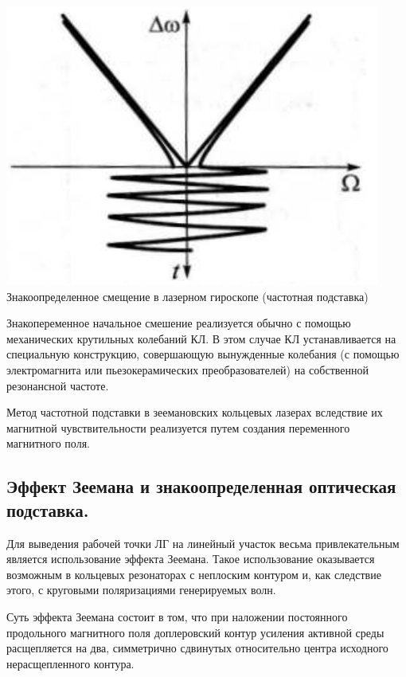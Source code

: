 \documentclass[a4paper,12pt]{article} %
\begin{document}
\begin{center}
    \includegraphics[scale=0.7]{pic7}\\
    \caption{Знакоопределенное смещение в лазерном гироскопе (частотная подставка)}
\end{center}

Знакопеременное начальное смешение реализуется обычно с помощью механических крутильных колебаний КЛ. В этом случае КЛ устанавливается на
специальную конструкцию, совершающую вынужденные колебания (с помощью электромагнита или пьезокерамических преобразователей) на собственной
резонансной частоте.

Метод частотной подставки в зеемановских кольцевых лазерах вследствие
их магнитной чувствительности реализуется путем создания переменного магнитного поля.

\subsection{Эффект Зеемана и знакоопределенная оптическая подставка.}

Для выведения рабочей точки ЛГ на линейный участок весьма
привлекательным является использование эффекта Зеемана. Такое использование оказывается возможным в кольцевых резонаторах с неплоским контуром и, как следствие этого, с круговыми поляризациями генерируемых волн.

Суть эффекта Зеемана состоит в том, что при наложении постоянного
продольного магнитного поля доплеровский контур усиления активной среды
расщепляется на два, симметрично сдвинутых относительно центра исходного
нерасщепленного контура.
\end{document}
